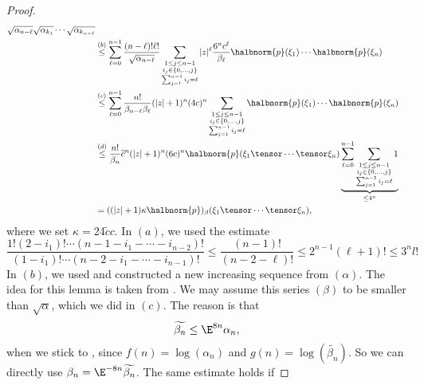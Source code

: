 \documentclass[
11pt,                          %
english                        %
]{article}
\begin{document}
\begin{proof}
\begin{align*}
		{\sqrt{\alpha_{n - \ell}} 
		\sqrt{\alpha_{k_1}} \cdots \sqrt{\alpha_{k_{n - \ell}}}}		
		\\
		& \stackrel{(b)}{\leq}
		\sum\limits_{\ell = 0}^{n-1}
		\frac{(n-\ell)! \ell!}{\sqrt{\alpha_{n - \ell}}}
		\sum\limits_{\substack{
			1 \leq j \leq n-1 \\
			i_j \in \{0, \ldots, j\} \\
			\sum_{j=1}^{n-1} i_j = \ell
		}}
		|z|^\ell
		\frac{6^n c^\ell}{\beta_{\ell}}
		\halbnorm{p}(\xi_1) \cdots \halbnorm{p}(\xi_n)
		\\
		& \stackrel{(c)}{\leq}
		\sum\limits_{\ell = 0}^{n-1}
		\frac{n!}{\beta_{n - \ell} \beta_\ell}
		(|z| + 1)^n
		(4c)^n
		\sum\limits_{\substack{
			1 \leq j \leq n-1 \\
			i_j \in \{0, \ldots, j\} \\
			\sum_{j=1}^{n-1} i_j = \ell
		}}
		\halbnorm{p}(\xi_1) \cdots \halbnorm{p}(\xi_n)
		\\
		& \stackrel{(d)}{\leq}
		\frac{n!}{\beta_n}
		\widetilde{c}^n (|z| + 1)^n (6c)^n
		\halbnorm{p}(\xi_1 \tensor \cdots \tensor \xi_n)
		\underbrace{
			\sum\limits_{\ell = 0}^{n-1}
			\sum\limits_{\substack{
				1 \leq j \leq n-1 \\
				i_j \in \{0, \ldots, j\} \\
				\sum_{j=1}^{n-1} i_j = \ell
			}}
			1
		}_{ \leq 4^n }
		\\
		&=
		( (|z| + 1) \kappa \halbnorm{p})_\beta
		(\xi_1 \tensor \cdots \tensor \xi_n),
	\end{align*}
	where we set $\kappa = 24 \widetilde{c} c$. In $(a)$, we used the estimate
	\begin{equation*}
		\frac{1! (2 - i_1)! \cdots (n-1-i_1- \cdots - i_{n-2})!}
		{(1 - i_1)! \cdots (n-2-i_1- \cdots - i_{n-1})!}
		\leq
		\frac{(n-1)!}{(n - 2 - \ell)!}
		\leq
		2^{n-1} (\ell + 1)!
		\leq
		3^n l!
	\end{equation*}
	In $(b)$, we used \cite[Lemma 6.4.7]{stapor:2015a} and constructed a new 
	increasing sequence from $(\alpha)$. The idea for this lemma is taken from 
	\cite{mitiagin.rolewicz.zelazko:1962a}. We may assume this series $(\beta)$
	to be smaller than $\sqrt{\alpha}$, which we did in $(c)$. The reason is that
	\begin{equation*}
		\widetilde{\beta_n}
		\leq
		\E^{8 n}
		\alpha_n,
	\end{equation*}
	when we stick to \cite[Equation 6.4.8]{stapor:2015a}, since $f(n) = 
	\log(\alpha_n)$ and $g(n) = \log(\widetilde{\beta_n})$. So we can directly use 
	$\beta_n = \E^{-8n} \widetilde{\beta_n}$. The same estimate holds if 

\end{proof}
\end{document}
